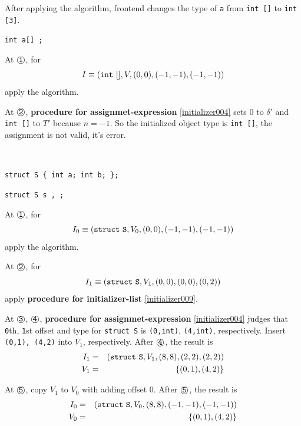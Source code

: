 After applying the algorithm, frontend changes the type of
{\tt{a}} from {\tt{int []}} to {\tt{int [3]}}.

\begin{Example}
{\tt int a[]
;
}

\noindent
At $\MARU{\tt 1}$, for
\[
I \equiv ({\tt{int\,\,[]}},V,(0,0),(-1,-1),(-1,-1)) 
\]
apply the algorithm.

\noindent
At $\MARU{\tt 2}$, {\bf procedure for assignmet-expression}
 \ref{initializer004} sets $0$ to ${\delta}'$ and 
{\tt{int []}} to $T'$ because  
$n = -1$. So the initialized object type is {\tt int []},
the assignment is not valid, it's error.
\end{Example}

\begin{Example}

\

{\tt struct S \{ int a; int b; \};}

{\tt struct S s 
,
;
}

\noindent
At $\MARU{\tt 1}$, for
\[
I_0 \equiv ({\tt{struct\,\,S}},V_0,(0,0),(-1,-1),(-1,-1)) 
\]
apply the algorithm.

\noindent
At $\MARU{\tt 2}$, for
\[
I_1 \equiv ({\tt{struct\,\,S}},V_1,(0,0),(0,0),(0,2))
\]
apply {\bf procedure for initializer-list} \ref{initializer009}.


\noindent
At $\MARU{\tt 3}$, $\MARU{\tt 4}$,
{\bf procedure for assignmet-expression}
 \ref{initializer004} judges that
{\tt{0}}th, {\tt{1}}st 
offset and type for {\tt struct S} is 
{\tt (0,int)}, {\tt (4,int)},  respectively.
Insert {\tt (0,1), (4,2)} into $V_1$, respectively.
After $\MARU{\tt 4}$, the result is
\begin{eqnarray*}
I_1 & = & ({\tt{struct\,\,S}},V_1,(8,8),(2,2),(2,2)) \\
V_1 & = & \{(0,1), (4,2)\}
\end{eqnarray*}

\noindent
At $\MARU{\tt 5}$,
copy $V_1$ to $V_0$ with adding offset $0$.
After $\MARU{\tt 5}$, the result is
\begin{eqnarray*}
I_0 & = & ({\tt{struct\,\,S}},V_0,(8,8),(-1,-1),(-1,-1)) \\
V_0 & = & \{(0,1), (4,2)\}
\end{eqnarray*}
\end{Example}


